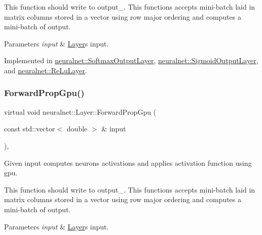 This function should write to output\+\_\+. This functions accepts mini-\/batch laid in matrix columns stored in a vector using row major ordering and computes a mini-\/batch of output.


\begin{DoxyParams}{Parameters}
{\em input} & \hyperlink{classneuralnet_1_1Layer}{Layer}\textquotesingle{}s input. \\
\hline
\end{DoxyParams}


Implemented in \hyperlink{classneuralnet_1_1SoftmaxOutputLayer_a6a18e1e7fc94cb7f3d66dfad2dcb1f85}{neuralnet\+::\+Softmax\+Output\+Layer}, \hyperlink{classneuralnet_1_1SigmoidOutputLayer_a95e0f2dcabbb16bd24a59f19eaf0999f}{neuralnet\+::\+Sigmoid\+Output\+Layer}, and \hyperlink{classneuralnet_1_1ReLuLayer_a8828d7147d25d9854452e9d2e1e79857}{neuralnet\+::\+Re\+Lu\+Layer}.

\mbox{\label{classneuralnet_1_1Layer_abd0fdf1146eb28485349337e68ad7982}} 
\subsubsection{\texorpdfstring{Forward\+Prop\+Gpu()}{ForwardPropGpu()}}
{\footnotesize\ttfamily virtual void neuralnet\+::\+Layer\+::\+Forward\+Prop\+Gpu (\begin{DoxyParamCaption}\item[{const std\+::vector$<$ double $>$ \&}]{input }\end{DoxyParamCaption})\hspace{0.3cm}{\ttfamily [protected]}, {}}



Given input computes neurons\textquotesingle{} activations and applies activation function using gpu. 

This function should write to output\+\_\+. This functions accepts mini-\/batch laid in matrix columns stored in a vector using row major ordering and computes a mini-\/batch of output.


\begin{DoxyParams}{Parameters}
{\em input} & \hyperlink{classneuralnet_1_1Layer}{Layer}\textquotesingle{}s input. \\
\hline
\end{DoxyParams}


